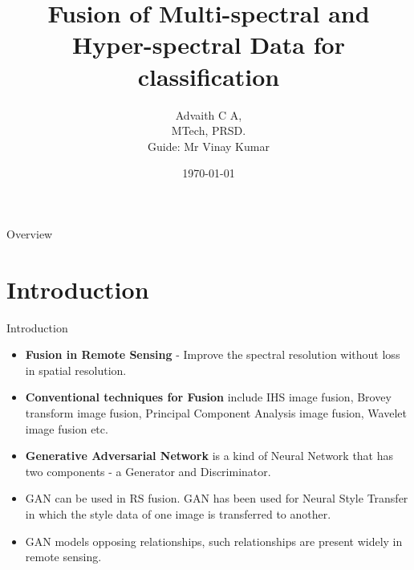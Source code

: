 \documentclass{beamer}
\title[Image Fusion using GAN]{Fusion of Multi-spectral and Hyper-spectral Data for classification}
\author[Advaith C A]{Advaith C A,\\MTech, PRSD.\\Guide: Mr Vinay Kumar}
\date{\today}
\begin{document}
\begin{frame}
    \maketitle
\end{frame}
\begin{frame}{Overview}
    \hfill
    \parbox[t]{.89\textwidth}{
      \begin{minipage}[c][0.6\textheight]{\textwidth}
      \tableofcontents
      \end{minipage}
    }
\end{frame}
\section{Introduction}
\begin{frame}{Introduction}
    \begin{itemize}
        \item \textbf{Fusion in Remote Sensing} - Improve the spectral resolution without loss in spatial resolution.
        \item \textbf{Conventional techniques for Fusion} include IHS image fusion, Brovey transform image fusion, Principal Component Analysis image fusion, Wavelet image fusion etc.
        \item \textbf{Generative Adversarial Network} is a kind of Neural Network that has two components - a Generator and Discriminator.
        \item GAN can be used in RS fusion. GAN has been used for Neural Style Transfer in which the style data of one image is transferred to another.
        \item GAN models opposing relationships, such relationships are present widely in remote sensing.
    \end{itemize}
\end{frame}
\end{document}
